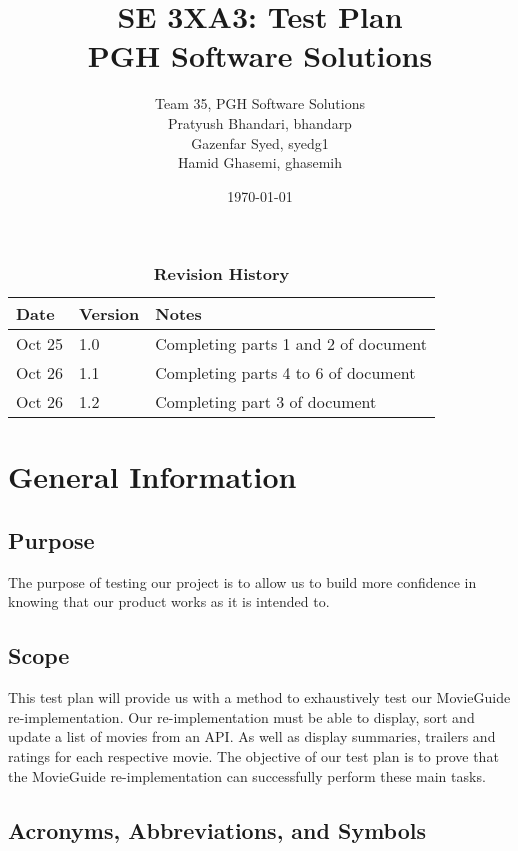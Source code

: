 \documentclass[12pt, titlepage]{article}
\title{SE 3XA3: Test Plan\\PGH Software Solutions}
\author{Team 35, PGH Software Solutions
		\\ Pratyush Bhandari, bhandarp
		\\ Gazenfar Syed, syedg1
		\\ Hamid Ghasemi, ghasemih}
\date{\today}
\begin{document}
\maketitle

\tableofcontents

\newpage
\listoftables

\begin{table}[bp]
\caption{\bf Revision History}
\begin{tabularx}{\textwidth}{p{3cm}p{2cm}X}
\toprule {\bf Date} & {\bf Version} & {\bf Notes}\\
\midrule
Oct 25 & 1.0 & Completing parts 1 and 2 of document\\
Oct 26 & 1.1 & Completing parts 4 to 6 of document\\
Oct 26 & 1.2 & Completing part 3 of document\\
\bottomrule
\end{tabularx}
\end{table}

\newpage



\section{General Information}

\subsection{Purpose}
The purpose of testing our project is to allow us to build more confidence in knowing that our product works as it is intended to.

\subsection{Scope}
This test plan will provide us with a method to exhaustively test our MovieGuide re-implementation. Our re-implementation must be able to display, sort and update a list of movies from an API. As well as display summaries, trailers and ratings for each respective movie. The objective of our test plan is to prove that the MovieGuide re-implementation can successfully perform these main tasks. 


\subsection{Acronyms, Abbreviations, and Symbols}
	
\end{document}
